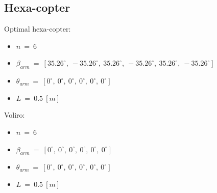 \subsection{Hexa-copter}
\label{sec:hexa_copter}

Optimal hexa-copter:
\begin{itemize}
  \item $n\ =\ 6$
  \item $\beta_{arm}\ =\ [35.26^{\circ},\  -35.26^{\circ},\  35.26^{\circ},\  -35.26^{\circ},\
                          35.26^{\circ},\  -35.26^{\circ}]$
  \item $\theta_{arm}\ =\ [0^{\circ},\  0^{\circ},\  0^{\circ},\  0^{\circ},\ 0^{\circ},\  0^{\circ}]$
  \item $L\ =\ 0.5\ [m]$
\end{itemize}

Voliro:
\begin{itemize}
  \item $n\ =\ 6$
  \item $\beta_{arm}\ =\ [0^{\circ},\  0^{\circ},\  0^{\circ},\  0^{\circ},\ 0^{\circ},\  0^{\circ}]$
  \item $\theta_{arm}\ =\ [0^{\circ},\  0^{\circ},\  0^{\circ},\  0^{\circ},\ 0^{\circ},\  0^{\circ}]$
  \item $L\ =\ 0.5\ [m]$
\end{itemize}

